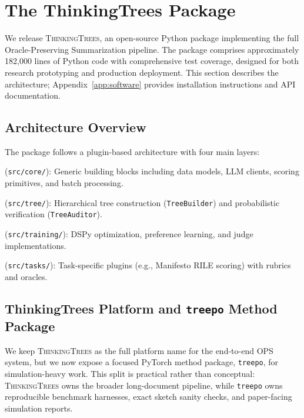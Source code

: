 \section{The ThinkingTrees Package}\label{sec:software}

We release \textsc{ThinkingTrees}, an open-source Python package implementing the full Oracle-Preserving Summarization pipeline. The package comprises approximately 182,000 lines of Python code with comprehensive test coverage, designed for both research prototyping and production deployment. This section describes the architecture; Appendix~\ref{app:software} provides installation instructions and API documentation.

\subsection{Architecture Overview}

The package follows a plugin-based architecture with four main layers:

\begin{description}[nosep]
    \item[Core Layer] (\texttt{src/core/}): Generic building blocks including data models, LLM clients, scoring primitives, and batch processing.
    \item[Tree Layer] (\texttt{src/tree/}): Hierarchical tree construction (\texttt{TreeBuilder}) and probabilistic verification (\texttt{TreeAuditor}).
    \item[Training Layer] (\texttt{src/training/}): DSPy optimization, preference learning, and judge implementations.
    \item[Task Layer] (\texttt{src/tasks/}): Task-specific plugins (e.g., Manifesto RILE scoring) with rubrics and oracles.
\end{description}

\subsection{ThinkingTrees Platform and \texttt{treepo} Method Package}

We keep \textsc{ThinkingTrees} as the full platform name for the end-to-end OPS system, but we now expose a focused PyTorch method package, \texttt{treepo}, for simulation-heavy work. This split is practical rather than conceptual: \textsc{ThinkingTrees} owns the broader long-document pipeline, while \texttt{treepo} owns reproducible benchmark harnesses, exact sketch sanity checks, and paper-facing simulation reports.

